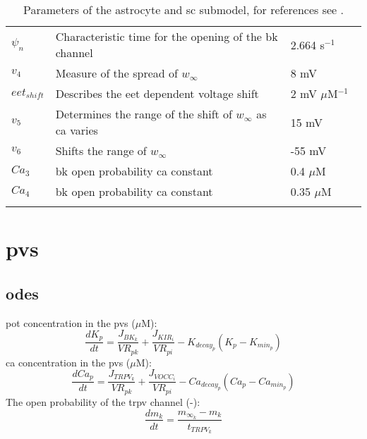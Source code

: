 \documentclass[11pt]{elsarticle}
\newcommand{\uM}{$\mu$M\xspace}
\newcommand{\n}{$^{-1}$\xspace}
\newcommand{\psec}{s$^{-1}$\xspace}
\newcommand{\pot}{\gls{pot}\xspace}
\newcommand{\ca}{\gls{ca}\xspace}
\begin{document}
\begin{longtable}[h!]{ p{0.1\linewidth}   p{0.68\linewidth}   p{0.22\linewidth} }
$\psi_n$ & Characteristic time for the opening of the \gls{bk} channel & 2.664 \psec  \\
$v_4$ & Measure of the spread of $w_{\infty}$  & 8 mV \\
$eet_{shift}$& Describes the \gls{eet} dependent voltage shift  & 2 mV \uM\n   \\
$v_5$ & Determines the range of the shift of $w_{\infty}$ as \ca varies  & 15 mV \\
$v_6$& Shifts the range of $w_{\infty}$  & -55 mV  \\
$Ca_3$ & \Gls{bk} open probability \ca constant  & 0.4 \uM \\
$Ca_4$& \gls{bk} open probability \ca constant   & 0.35 \uM  \\			
			\hline
\caption{Parameters of the astrocyte and \gls{sc} submodel, for references see \citet{Dormanns2015, Kenny2018}.}
\end{longtable}

\section{\Gls{pvs}}
%
\subsection{\Glspl{ode}}
%
\pot concentration in the \gls{pvs}  (\uM):
\begin{equation} \label{eq:K_p}
\frac{dK_{p}}{dt}= \frac{J_{BK_k}}{VR_{pk}} + \frac{J_{KIR_i}}{VR_{pi}} - K_{decay_p} (K_p - K_{min_p})
\end{equation}
%
\ca concentration in the \gls{pvs} (\uM): 
\begin{equation}
\frac{d Ca_p}{dt} = \frac{J_{TRPV_k}}{VR_{pk}} + \frac{J_{VOCC_i}}{VR_{pi}} - Ca_{decay_p} ( Ca_p - Ca_{min_p} )
\end{equation}
%
The open probability of the \gls{trpv} channel (-): 
\begin{equation}
\frac{d m_k}{dt} = \frac{m_{\infty_k} - m_k}{t_{TRPV_k}} 
\end{equation}
%
\end{document}
